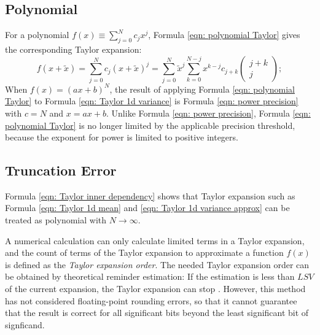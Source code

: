 \documentclass[twoside]{article}
\numberwithin{equation}{section}
\begin{document}
\fi

\subsection{Polynomial}

For a polynomial $f(x) \equiv \sum_{j=0}^{N} c_j x^j$, Formula \eqref{eqn: polynomial Taylor} gives the corresponding Taylor expansion:
\begin{equation}
\label{eqn: polynomial Taylor}
f(x + \tilde{x}) = \sum_{j=0}^{N} c_j (x + \tilde{x})^j = \sum_{j=0}^{N} \tilde{x}^{j} \sum_{k=0}^{N-j} x^{k - j} c_{j + k} \begin{pmatrix} j + k \\ j \end{pmatrix};
\end{equation}
When $f(x) = (ax + b)^N$, the result of applying Formula \eqref{eqn: polynomial Taylor} to Formula \eqref{eqn: Taylor 1d variance} is Formula \eqref{eqn: power precision} with $c=N$ and $x = ax + b$. 
Unlike Formula \eqref{eqn: power precision}, Formula \eqref{eqn: polynomial Taylor} is no longer limited by the applicable precision threshold, because the exponent for power is limited to positive integers.



\subsection{Truncation Error}

Formula \eqref{eqn: Taylor inner dependency} shows that Taylor expansion such as Formula \eqref{eqn: Taylor 1d mean} and \eqref{eqn: Taylor 1d variance approx} can be treated as polynomial with $N \rightarrow \infty$.

A numerical calculation can only calculate limited terms in a Taylor expansion, and the count of terms of the Taylor expansion to approximate a function $f(x)$ is defined as the \emph{Taylor expansion order}.
The needed Taylor expansion order can be obtained by theoretical reminder estimation: If the estimation is less than $LSV$ of the current expansion, the Taylor expansion can stop \cite{Numerical_Recipes}.
However, this method has not considered floating-point rounding errors, so that it cannot guarantee that the result is correct for all significant bits beyond the least significant bit of signficand.
\end{document}
